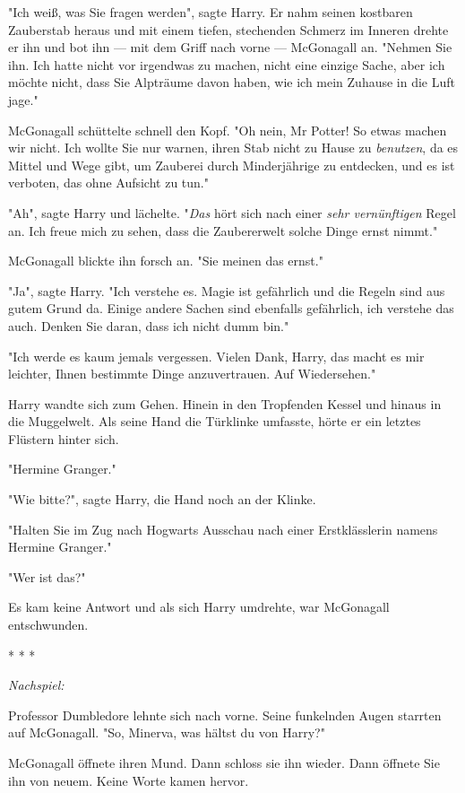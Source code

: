 {"Ich weiß, was Sie fragen werden", sagte Harry. Er nahm seinen kostbaren Zauberstab heraus und mit einem tiefen, stechenden Schmerz im Inneren drehte er ihn und bot ihn --- mit dem Griff nach vorne --- McGonagall an. "Nehmen Sie ihn. Ich hatte nicht vor irgendwas zu machen, nicht eine einzige Sache, aber ich möchte nicht, dass Sie Alpträume davon haben, wie ich mein Zuhause in die Luft jage."

McGonagall schüttelte schnell den Kopf. "Oh nein, Mr Potter! So etwas machen wir nicht. Ich wollte Sie nur warnen, ihren Stab nicht zu Hause zu \emph{benutzen}, da es Mittel und Wege gibt, um Zauberei durch Minderjährige zu entdecken, und es ist verboten, das ohne Aufsicht zu tun."

"Ah", sagte Harry und lächelte. "\emph{Das} hört sich nach einer \emph{sehr vernünftigen} Regel an. Ich freue mich zu sehen, dass die Zaubererwelt solche Dinge ernst nimmt."

McGonagall blickte ihn forsch an. "Sie meinen das ernst."

"Ja", sagte Harry. "Ich verstehe es. Magie ist gefährlich und die Regeln sind aus gutem Grund da. Einige andere Sachen sind ebenfalls gefährlich, ich verstehe das auch. Denken Sie daran, dass ich nicht dumm bin."

"Ich werde es kaum jemals vergessen. Vielen Dank, Harry, das macht es mir leichter, Ihnen bestimmte Dinge anzuvertrauen. Auf Wiedersehen."

Harry wandte sich zum Gehen. Hinein in den Tropfenden Kessel und hinaus in die Muggelwelt. Als seine Hand die Türklinke umfasste, hörte er ein letztes Flüstern hinter sich.

"Hermine Granger."

"Wie bitte?", sagte Harry, die Hand noch an der Klinke.

"Halten Sie im Zug nach Hogwarts Ausschau nach einer Erstklässlerin namens Hermine Granger."

"Wer ist das?"

Es kam keine Antwort und als sich Harry umdrehte, war McGonagall entschwunden.

* * *

\emph{Nachspiel:}

Professor Dumbledore lehnte sich nach vorne. Seine funkelnden Augen starrten auf McGonagall. "So, Minerva, was hältst du von Harry?"

McGonagall öffnete ihren Mund. Dann schloss sie ihn wieder. Dann öffnete Sie ihn von neuem. Keine Worte kamen hervor.

}
